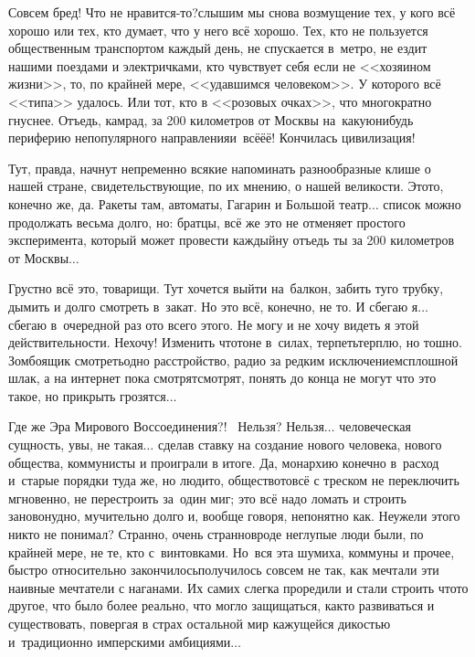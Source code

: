 \diagdash Совсем бред! Что не нравится-то?\mdash слышим мы снова возмущение тех, у кого всё хорошо или тех, кто думает, что у него всё хорошо. Тех, кто не пользуется общественным транспортом каждый день, не спускается в~метро, не ездит нашими поездами и электричками, кто чувствует себя если не <<хозяином жизни>>, то, по крайней мере, <<удавшимся человеком>>. У которого всё <<типа>> удалось. Или тот, кто в <<розовых очках>>, что многократно гнуснее. Отъедь, камрад, за 200 километров от Москвы на~какую\sdash нибудь периферию непопулярного направления\mdash и~всё\sdash ё\sdash ё! Кончилась цивилизация! 

Тут, правда, начнут непременно всякие напоминать разнообразные клише о нашей стране, свидетельствующие, по их мнению, о нашей великости. Это\sdash то, конечно же, да. Ракеты там, автоматы, Гагарин и Большой театр$\ldots$ список можно продолжать весьма долго, но: братцы, всё же это не отменяет простого эксперимента, который может провести каждый\mdash ну отъедь ты за 200 километров от Москвы$\ldots$

Грустно всё это, товарищи. Тут хочется выйти на~балкон, забить туго трубку, дымить и долго смотреть в~закат. Но это всё, конечно, не то. И сбегаю я$\ldots$ сбегаю в~очередной раз ото всего этого. Не могу и не хочу видеть я этой действительности. Не\sdash хо\sdash чу! Изменить что\sdash то\mdash не в~силах, терпеть\mdash терплю, но тошно. Зомбоящик смотреть\mdash одно расстройство, радио за редким исключением\mdash сплошной шлак, а на интернет пока смотрят\sdash смотрят, понять до конца не могут что это такое, но прикрыть грозятся$\ldots$

Где же Эра Мирового Воссоединения?!~\cite{ТуманностьАндромеды} Нельзя? Нельзя$\ldots$ человеческая сущность, увы, не такая$\ldots$ сделав ставку на создание нового человека, нового общества, коммунисты и проиграли в итоге. Да, монархию конечно в~расход и~старые порядки туда же, но люди\sdash то, общество\sdash то\mdash всё с треском не переключить мгновенно, не перестроить за~один миг; это всё надо ломать и строить заново\mdash нудно, мучительно долго и, вообще говоря, непонятно как. Неужели этого никто не понимал? Странно, очень странно\mdash вроде неглупые люди были, по крайней мере, не те, кто с~винтовками. Но~вся эта шумиха, коммуны и прочее, быстро относительно закончилось\mdash получилось совсем не так, как мечтали эти наивные мечтатели с наганами. Их самих слегка проредили и стали строить что\sdash то другое, что было более реально, что могло защищаться, как\sdash то развиваться и существовать, повергая в страх остальной мир кажущейся дикостью и~традиционно имперскими амбициями$\ldots$

